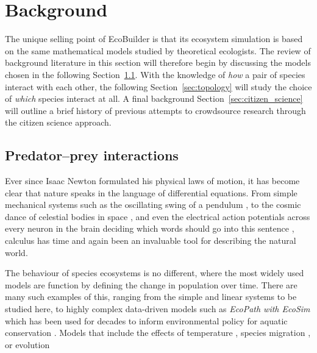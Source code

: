 \section{Background}
\label{sec:joy_background}
The unique selling point of EcoBuilder is that its ecosystem simulation is based on the same mathematical models studied by theoretical ecologists. The review of background literature in this section will therefore begin by discussing the models chosen in the following Section~\ref{sec:predator_prey}. With the knowledge of \emph{how} a pair of species interact with each other, the following Section~\ref{sec:topology} will study the choice of \emph{which} species interact at all. A final background Section~\ref{sec:citizen_science} will outline a brief history of previous attempts to crowdsource research through the citizen science approach.

\subsection{Predator--prey interactions}
\label{sec:predator_prey}
Ever since Isaac Newton formulated his physical laws of motion, it has become clear that nature speaks in the language of differential equations. From simple mechanical systems such as the oscillating swing of a pendulum \cite{Fulcher1987}, to the cosmic dance of celestial bodies in space \cite{Marchal2012}, and even the electrical action potentials across every neuron in the brain deciding which words should go into this sentence \cite{Hodgkin1952}, calculus has time and again been an invaluable tool for describing the natural world. 

The behaviour of species ecosystems is no different, where the most widely used models are function by defining the change in population over time.
There are many such examples of this, ranging from the simple and linear systems to be studied here, to highly complex data-driven models such as \emph{EcoPath with EcoSim} which has been used for decades to inform environmental policy for aquatic conservation \cite{Christensen2004}.
Models that include the effects of temperature \cite{Savage}, species migration \cite{SpacialTemporal}, or evolution \cite{TangledWeb}

